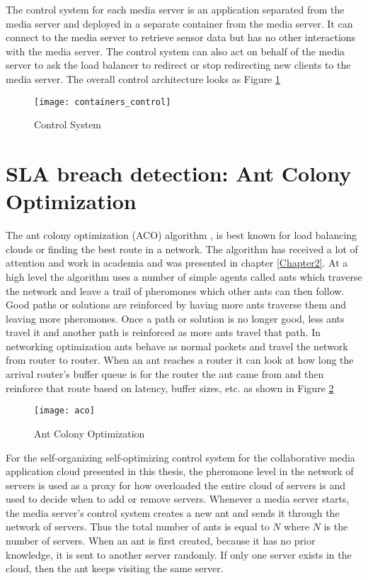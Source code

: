 The control system for each media server is an application separated from the media server and deployed in a separate container from the media server. It can connect to the media server to retrieve sensor data but has no other interactions with the media server. The control system can also act on behalf of the media server to ask the load balancer to redirect or stop redirecting new clients to the media server. The overall control architecture looks as Figure \ref{fig:control-containers}

\begin{figure}
	\centering
	\texttt{[image: containers\_control]}
	\caption{Control System}
	\label{fig:control-containers}
\end{figure}

\section{SLA breach detection: Ant Colony Optimization}

The ant colony optimization (ACO) algorithm \cite{antalgorithm}, \cite{selforg:aco} is best known for load balancing clouds or finding the best route in a network. The algorithm has received a lot of attention and work in academia and was presented in chapter \ref{Chapter2}. At a high level the algorithm uses a number of simple agents called ants which traverse the network and leave a trail of pheromones which other ants can then follow. Good paths or solutions are reinforced by having more ants traverse them and leaving more pheromones. Once a path or solution is no longer good, less ants travel it and another path is reinforced as more ants travel that path. In networking optimization ants behave as normal packets and travel the network from router to router. When an ant reaches a router it can look at how long the arrival router's buffer queue is for the router the ant came from and then reinforce that route based on latency, buffer sizes, etc. as shown in Figure \ref{fig:aco}

\begin{figure}
	\centering
	\texttt{[image: aco]}
	\caption{Ant Colony Optimization}
	\label{fig:aco}
\end{figure}

For the self-organizing self-optimizing control system for the collaborative media application cloud presented in this thesis, the pheromone level in the network of servers is used as a proxy for how overloaded the entire cloud of servers is and used to decide when to add or remove servers. Whenever a media server starts, the media server's control system creates a new ant and sends it through the network of servers. Thus the total number of ants is equal to $N$ where $N$ is the number of servers. When an ant is first created, because it has no prior knowledge, it is sent to another server randomly. If only one server exists in the cloud, then the ant keeps visiting the same server.

